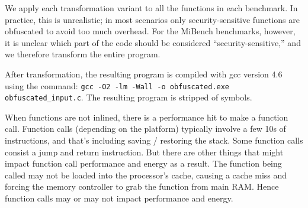 We apply each transformation variant to all the functions in each benchmark. In practice, this is unrealistic; in most scenarios only security-sensitive functions are obfuscated to avoid too much overhead. For the MiBench benchmarks, however, it is unclear which part of the code should be considered ``security-sensitive,'' and we therefore transform the entire program.


After transformation, the resulting program is compiled with gcc version 4.6 using the command: \texttt{gcc -O2 -lm -Wall -o obfuscated.exe obfuscated\_input.c}. The resulting program is stripped of symbols.

When functions are not inlined, there is a performance hit to make a function call.
Function calls (depending on the platform) typically involve a few 10s of instructions, and that's including saving / restoring the stack. Some function calls consist a jump and return instruction.
But there are other things that might impact function call performance and energy as a result. The function being called may not be loaded into the processor's cache, causing a cache miss and forcing the memory controller to grab the function from main RAM. Hence function calls may or may not impact performance and energy.

\endinput

\AR{Dr.Collberg: Can you add a short description of these options? Just stating it wouldn't make send to a reviewer. Else, how about having a table for this? Transformation | Options | Description}
\subsubsection{Virtualize}
Virtualize involves transforming a function into an interpretor, whose bytecode language is specialized for the particular function specified. 



\begin{itemize}
\item \textit{--VirtualizeDispatch=[direct,indirect and switch]}.
\item \textit{--VirtualizeSuperOpsRatio=[2 and 0]}.
\item \textit{--VirtualizeMaxMergeLength=[5 and 0]}.
\item \textit{--VirtualizePerformance=[AddressSizeShort, CacheTop and PointerStack]}.
\item \textit{--VirtualizeOperands=[stack and registers]}.
\end{itemize}


